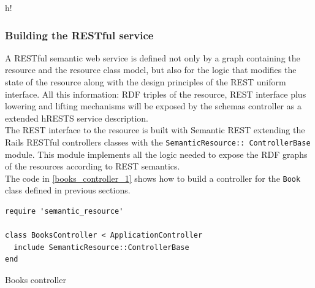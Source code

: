 \begin{table}{h!}
\noindent{}
\caption{The defined Book model RDF graph consumed by the Tabulator plugin}
\label{res_moz_1}
\end{table}

\subsubsection{Building the RESTful service}

A RESTful semantic web service is defined not only by a graph containing the resource and the resource class model, but also
for the logic that modifies the state of the resource along with the design principles of the REST uniform interface. All
this information: RDF triples of the resource, REST interface plus lowering and lifting mechanisms will be exposed by
the schemas controller as a extended hRESTS service description.\\
The REST interface to the resource is built with Semantic REST extending the Rails RESTful controllers classes with the
\texttt{SemanticResource:: ControllerBase} module. This module implements all the logic needed to expose the RDF graphs of the resources according to REST semantics.\\
The code in \ref{books_controller_1} shows how to build a controller for the \texttt{Book} class defined in previous
sections.

\begin{table}
\vspace{5 mm}
\begin{lstlisting}
require 'semantic_resource'

class BooksController < ApplicationController
  include SemanticResource::ControllerBase
end
\end{lstlisting} 
\vspace{5 mm}
\caption{Books controller}
\label{books_controller_1}
\end{table}

